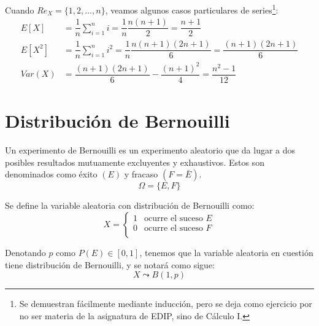 Cuando $Re_X = \{1, 2, \ldots, n\}$, veamos algunos casos particulares de series\footnote{Se demuestran fácilmente mediante inducción, pero se deja como ejercicio por no ser materia de la asignatura de EDIP, sino de Cálculo I.}:
\begin{equation*}
    \begin{split}
        E[X] &= \dfrac{1}{n}\sum_{i=1}^n i = \dfrac{1}{n}\dfrac{n(n+1)}{2} = \dfrac{n+1}{2}\\
        E[X^2] &= \dfrac{1}{n}\sum_{i=1}^n i^2 = \dfrac{1}{n}\dfrac{n(n+1)(2n+1)}{6} = \dfrac{(n+1)(2n+1)}{6}\\
        Var(X) &= \dfrac{(n+1)(2n+1)}{6} - \dfrac{(n+1)^2}{4} = \dfrac{n^2-1}{12}
    \end{split}
\end{equation*}



\section{Distribución de Bernouilli}

\begin{definicion}
    Un experimento de Bernouilli es un experimento aleatorio que da lugar a dos posibles resultados mutuamente excluyentes y exhaustivos. Estos son denominados como éxito $(E)$ y fracaso $(F=\bar{E})$.
    \begin{equation*}
        \Omega = \{E,F\}
    \end{equation*}
\end{definicion}

\begin{definicion}
    Se define la variable aleatoria con distribución de Bernouilli como:
    \begin{equation*}
        X = \left\{\begin{array}{cc}
            1 & \text{ocurre el suceso } E \\
            0 & \text{ocurre el suceso } F \\
        \end{array}\right.
    \end{equation*}

    Denotando $p$ como $P(E)\in [0,1]$, tenemos que la variable aleatoria en cuestión tiene distribución de Bernouilli, y se notará como sigue:
        \begin{equation*}
            X \leadsto B(1,p)
        \end{equation*}
\end{definicion}

